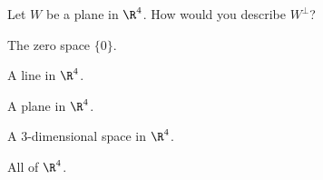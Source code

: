 \begin{frame}
\end{frame}



\begin{pollframe}

\begin{poll}
\vskip 1cm

\begin{bluebox}[Poll]{.8\linewidth}
  Let $W$ be a plane in $\R^4$.  How would you describe $W^\perp$?
  \smallskip
  \begin{eAlpherate}
  \item The zero space $\{0\}$.
  \item A line in $\R^4$.
  \item A plane in $\R^4$.
  \item A $3$-dimensional space in $\R^4$.
  \item All of $\R^4$.
  \end{eAlpherate}
\end{bluebox}
\end{poll}

\end{pollframe}



